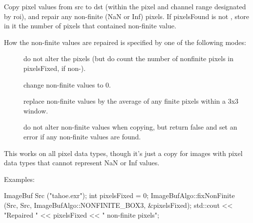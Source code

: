  

Copy pixel values from {\cf src} to {\cf dst} (within the pixel and channel
range designated by {\cf roi}), and repair any non-finite ({\cf NaN} or {\cf
Inf}) pixels.  If {\cf pixelsFound} is not \NULL, store in it the number of
pixels that contained non-finite value.

How the non-finite values are repaired is specified by one of the
following modes:

\begin{description}
\item[\spc] \spc
\item[\rm {}]   do not alter the pixels (but do count the number
                       of nonfinite pixels in {\cf *pixelsFixed}, if non-\NULL).
\item[\rm {}]  change non-finite values to 0.
\item[\rm {}]   replace non-finite values by the average of any
                     finite pixels within a 3x3 window.
\item[\rm {}]  do not alter non-finite values when copying,
                     but return {\cf false} and set an error if any non-finite
                     values are found.
\end{description}

This works on all pixel data types, though it's just a copy for images with
pixel data types that cannot represent {\cf NaN} or {\cf Inf} values.


\smallskip
\noindent Examples:
\begin{code}
    ImageBuf Src ("tahoe.exr");
    int pixelsFixed = 0;
    ImageBufAlgo::fixNonFinite (Src, Src, ImageBufAlgo::NONFINITE_BOX3,
                                &pixelsFixed);
    std::cout << "Repaired " << pixelsFixed << " non-finite pixels\n";
\end{code}
\apiend


